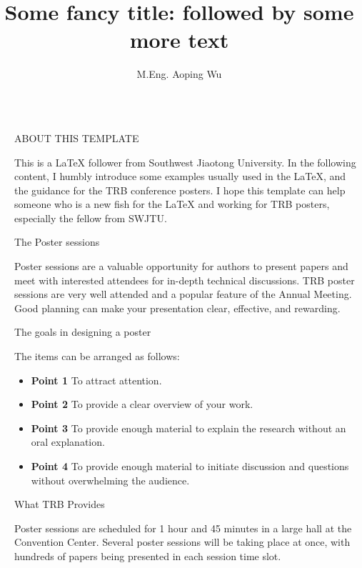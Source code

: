 \documentclass[final]{beamer}
\title{Some fancy title: followed by some more text}
\author{M.Eng. Aoping Wu}
\institute[shortinst]{School of Transportation and Logistics, Southwest Jiaotong University}
\newlength{\sepwidth}
\newlength{\colwidth}
\newcommand{\separatorcolumn}{\begin{column}{\sepwidth}\end{column}}
\begin{document}
\begin{frame}[t]
\begin{columns}[t]
\separatorcolumn

\begin{column}{\colwidth}

\begin{block}{ABOUT THIS TEMPLATE}

    This is a LaTeX follower from Southwest Jiaotong University.
    In the following content, I humbly introduce some examples usually used in the LaTeX, and the guidance for the TRB conference posters.
    I hope this template can help someone who is a new fish for the LaTeX and working for TRB posters, especially the fellow from SWJTU.

  \end{block}
  
  \begin{block}{The Poster sessions}

    Poster sessions are a valuable opportunity for authors to present papers and meet with interested attendees for in-depth technical discussions. TRB poster sessions are very well attended and a popular feature of the Annual Meeting. Good planning can make your presentation clear, effective, and rewarding.

  \end{block}

  \begin{block}{The goals in designing a poster}

    The items can be arranged as follows: 
    
    \begin{itemize}
      \item \textbf{Point 1} To attract attention.
      \item \textbf{Point 2} To provide a clear overview of your work.
      \item \textbf{Point 3} To provide enough material to explain the research without an oral explanation.
      \item \textbf{Point 4} To provide enough material to initiate discussion and questions without overwhelming the audience.
    \end{itemize}


  \end{block}

  \begin{alertblock}{What TRB Provides}
   

    Poster sessions are scheduled for 1 hour and 45 minutes in a large hall at the Convention Center. Several poster sessions will be taking place at once, with hundreds of papers being presented in each session time slot.


\end{alertblock}
\end{column}
\end{columns}
\end{frame}
\end{document}

